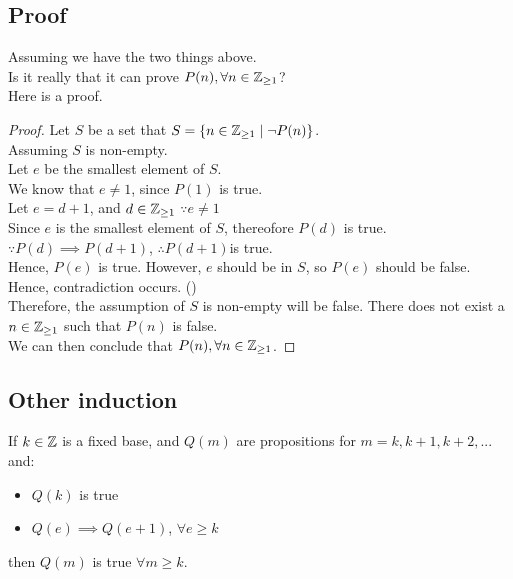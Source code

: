 \documentclass[a4paper]{article}
\begin{document}
\subsection{Proof}
Assuming we have the two things above.\\
Is it really that it can prove $P(n), \forall n \in \mathbb{Z}_{\geq 1}$?\\
Here is a proof.
\begin{proof}
Let $S$ be a set that $S = \{n \in \mathbb{Z}_{\geq 1} \mid \lnot P(n)\}$.\\
Assuming $S$ is non-empty.\\
Let $e$ be the smallest element of $S$.\\
We know that $e \neq 1$, since $P(1)$ is true.\\
Let $e = d + 1$, and $d \in \mathbb{Z}_{\geq 1}$ $\because e \neq 1$\\
Since $e$ is the smallest element of $S$, thereofore $P(d)$ is true.\\
$\because P(d) \implies P(d+1)$, $\therefore P(d+1)$is true.\\
Hence, $P(e)$ is true. However, $e$ should be in $S$, so $P(e)$ should be false.\\
Hence, contradiction occurs. (\contradiction)\\
Therefore, the assumption of $S$ is non-empty will be false. There does not exist a $n \in \mathbb{Z}_{\geq 1}$ such that $P(n)$ is false.\\
We can then conclude that $P(n), \forall n \in \mathbb{Z}_{\geq 1}$.
\end{proof}

\subsection{Other induction}
\begin{thm}
If $k \in \mathbb{Z}$ is a fixed base, and $Q(m)$ are propositions for $m = k, k+1, k+2,...$ and:
\begin{itemize}
	\item $Q(k)$ is true
	\item $Q(e) \implies Q(e+1)$, $\forall e \geq k$
\end{itemize}
then $Q(m)$ is true $\forall m \geq k$.
\end{thm}
\end{document}

